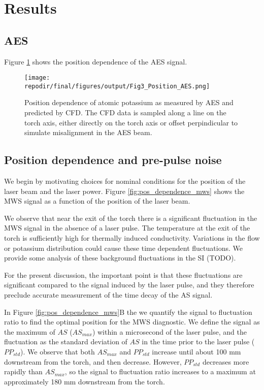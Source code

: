 

\section{Results}

\subsection{AES}

Figure \ref{fig:pos_dependence_aes} shows the position dependence of the AES signal. 

\begin{figure}[h]
    \texttt{[image: \\repodir/final/figures/output/Fig3\_Position\_AES.png]} 
    \caption{Position dependence of atomic potassium as measured by AES and predicted by CFD. The CFD data is sampled along a line on the torch axis, either directly on the torch axis or offset perpindicular to simulate misalignment in the AES beam. }
    \label{fig:pos_dependence_aes}
\end{figure}

\subsection{Position dependence and pre-pulse noise}

We begin by motivating choices for nominal conditions for the position of the laser beam and the laser power. Figure \ref{fig:pos_dependence_mws} shows the MWS signal as a function of the position of the laser beam. 

We observe that near the exit of the torch there is a significant fluctuation in the MWS signal in the absence of a laser pulse. The temperature at the exit of the torch is sufficiently high for thermally induced conductivity. Variations in the flow or potassium distribution could cause these time dependent fluctuations. We provide some analysis of these background fluctuations in the SI (TODO).

For the present discussion, the important point is that these fluctuations are significant compared to the signal induced by the laser pulse, and they therefore preclude accurate measurement of the time decay of the AS signal. 

In Figure \ref{fig:pos_dependence_mws}B the we quantify the signal to fluctuation ratio to find the optimal position for the MWS diagnostic. We define the signal as the maximum of $AS$ ($AS_{max}$) within a microsecond of the laser pulse, and the fluctuation as the standard deviation of $AS$ in the time prior to the laser pulse ($PP_{std}$). We observe that both $AS_{max}$ and $PP_{std}$ increase until about 100 mm downstream from the torch, and then decrease. However, $PP_{std}$ decreases more rapidly than $AS_{max}$, so the signal to fluctuation ratio increases to a maximum at approximately 180 mm downstream from the torch. 


